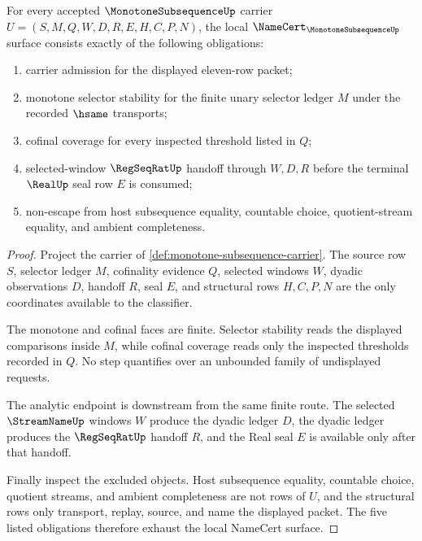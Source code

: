 \begin{theorem}
\label{thm:monotone-subsequence-namecert-obligations}
For every accepted $\MonotoneSubsequenceUp$ carrier $U=(S,M,Q,W,D,R,E,H,C,P,N)$, the local $\NameCert_{\MonotoneSubsequenceUp}$ surface consists exactly of the following obligations:
\begin{enumerate}
\item carrier admission for the displayed eleven-row packet;
\item monotone selector stability for the finite unary selector ledger $M$ under the recorded $\hsame$ transports;
\item cofinal coverage for every inspected threshold listed in $Q$;
\item selected-window $\RegSeqRatUp$ handoff through $W,D,R$ before the terminal $\RealUp$ seal row $E$ is consumed;
\item non-escape from host subsequence equality, countable choice, quotient-stream equality, and ambient completeness.
\end{enumerate}
\end{theorem}
\begin{proof}
Project the carrier of \autoref{def:monotone-subsequence-carrier}. The source row $S$, selector ledger $M$, cofinality evidence $Q$, selected windows $W$, dyadic observations $D$, handoff $R$, seal $E$, and structural rows $H,C,P,N$ are the only coordinates available to the classifier.

The monotone and cofinal faces are finite. Selector stability reads the displayed comparisons inside $M$, while cofinal coverage reads only the inspected thresholds recorded in $Q$. No step quantifies over an unbounded family of undisplayed requests.

The analytic endpoint is downstream from the same finite route. The selected $\StreamNameUp$ windows $W$ produce the dyadic ledger $D$, the dyadic ledger produces the $\RegSeqRatUp$ handoff $R$, and the Real seal $E$ is available only after that handoff.

Finally inspect the excluded objects. Host subsequence equality, countable choice, quotient streams, and ambient completeness are not rows of $U$, and the structural rows only transport, replay, source, and name the displayed packet. The five listed obligations therefore exhaust the local NameCert surface.
\end{proof}

